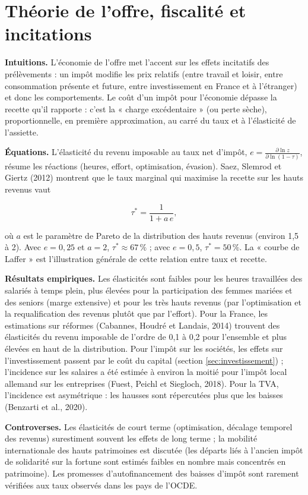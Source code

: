 \documentclass[
  11pt,
  11pt,
  a4paper,
  openany]{book}
\begin{document}
\hypertarget{sec:offre}{%
\section{Théorie de l'offre, fiscalité et incitations}\label{sec:offre}}

\textbf{Intuitions.} L'économie de l'offre met l'accent sur les effets
incitatifs des prélèvements : un impôt modifie les prix relatifs (entre
travail et loisir, entre consommation présente et future, entre
investissement en France et à l'étranger) et donc les comportements. Le
coût d'un impôt pour l'économie dépasse la recette qu'il rapporte :
c'est la « charge excédentaire » (ou perte sèche), proportionnelle, en
première approximation, au carré du taux et à l'élasticité de
l'assiette.

\textbf{Équations.} L'élasticité du revenu imposable au taux net
d'impôt, \(e = \frac{\partial \ln z}{\partial \ln(1-\tau)}\), résume les
réactions (heures, effort, optimisation, évasion). Saez, Slemrod et
Giertz (2012) montrent que le taux marginal qui maximise la recette sur
les hauts revenus vaut

\[\tau^* = \frac{1}{1 + a\,e},\]

où \(a\) est le paramètre de Pareto de la distribution des hauts revenus
(environ 1,5 à 2). Avec \(e = 0{,}25\) et \(a = 2\),
\(\tau^* \approx 67\,\%\) ; avec \(e = 0{,}5\), \(\tau^* = 50\,\%\). La
« courbe de Laffer » est l'illustration générale de cette relation entre
taux et recette.

\textbf{Résultats empiriques.} Les élasticités sont faibles pour les
heures travaillées des salariés à temps plein, plus élevées pour la
participation des femmes mariées et des seniors (marge extensive) et
pour les très hauts revenus (par l'optimisation et la requalification
des revenus plutôt que par l'effort). Pour la France, les estimations
sur réformes (Cabannes, Houdré et Landais, 2014) trouvent des
élasticités du revenu imposable de l'ordre de 0,1 à 0,2 pour l'ensemble
et plus élevées en haut de la distribution. Pour l'impôt sur les
sociétés, les effets sur l'investissement passent par le coût du capital
(section \ref{sec:investissement}) ; l'incidence sur les salaires a été
estimée à environ la moitié pour l'impôt local allemand sur les
entreprises (Fuest, Peichl et Siegloch, 2018). Pour la TVA, l'incidence
est asymétrique : les hausses sont répercutées plus que les baisses
(Benzarti et al., 2020).

\textbf{Controverses.} Les élasticités de court terme (optimisation,
décalage temporel des revenus) surestiment souvent les effets de long
terme ; la mobilité internationale des hauts patrimoines est discutée
(les départs liés à l'ancien impôt de solidarité sur la fortune sont
estimés faibles en nombre mais concentrés en patrimoine). Les promesses
d'autofinancement des baisses d'impôt sont rarement vérifiées aux taux
observés dans les pays de l'OCDE.
\end{document}
